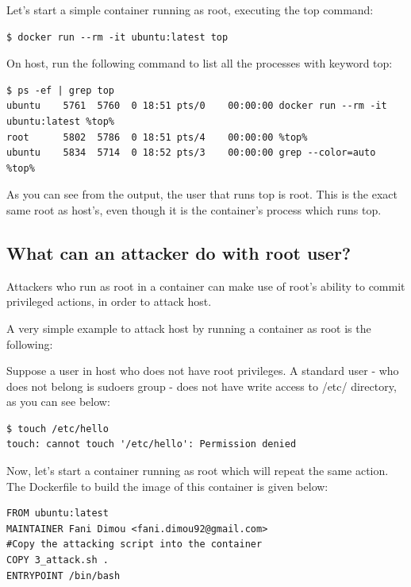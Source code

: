 Let's start a simple container running as root, executing the top command:

\begin{lstlisting}[style=dockercommands]
$ docker run --rm -it ubuntu:latest top
\end{lstlisting}

On host, run the following command to list all the processes with keyword top:
\begin{lstlisting}[style=terminal, basicstyle={\fontsize{10}{11}\color{black}\ttfamily}]
$ ps -ef | grep top
ubuntu    5761  5760  0 18:51 pts/0    00:00:00 docker run --rm -it ubuntu:latest %top%
root      5802  5786  0 18:51 pts/4    00:00:00 %top%
ubuntu    5834  5714  0 18:52 pts/3    00:00:00 grep --color=auto %top%
\end{lstlisting}

As you can see from the output, the user that runs top is root. This is the exact same root as host's, even though it is the container's process which runs top.

\subsection{What can an attacker do with root user?}
Attackers who run as root in a container can make use of root's ability to commit privileged actions, in order to attack host. 

A very simple example to attack host by running a container as root is the following: 

Suppose a user in host who does not have root privileges. A standard user - who does not belong is sudoers group - does not have write access to /etc/ directory, as you can see below:

\begin{lstlisting}[style=terminal]
$ touch /etc/hello
touch: cannot touch '/etc/hello': Permission denied
\end{lstlisting}

Now, let's start a container running as root which will repeat the same action. The Dockerfile to build the image of this container is given below:

\begin{lstlisting}[style=Dockerfile, caption={Dockerfile used for root\_attack image}]
FROM ubuntu:latest
MAINTAINER Fani Dimou <fani.dimou92@gmail.com>
#Copy the attacking script into the container
COPY 3_attack.sh .
ENTRYPOINT /bin/bash
\end{lstlisting}

